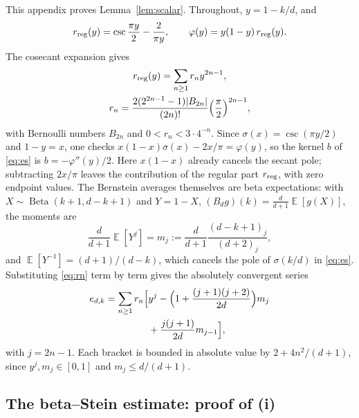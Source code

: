 \documentclass[aps,prl,reprint,superscriptaddress,longbibliography,floatfix,raggedbottom]{revtex4-2}
\newcommand{\abs}[1]{\lvert #1\rvert}
\DeclareMathOperator{\Beta}{Beta}
\DeclareMathOperator{\Ex}{\mathbb E}
\begin{document}
This appendix proves Lemma~\ref{lem:scalar}. Throughout, $y=1-k/d$,
and
\[
r_{\rm reg}(y)=\csc\frac{\pi y}2-\frac2{\pi y},\qquad
\varphi(y)=y(1-y)\,r_{\rm reg}(y).
\]
The cosecant expansion gives
\begin{equation}\label{eq:rn}
\begin{gathered}
r_{\rm reg}(y)=\sum_{n\ge1}r_ny^{2n-1},\\
r_n=\frac{2(2^{2n-1}-1)\abs{B_{2n}}}{(2n)!}
\Bigl(\frac\pi2\Bigr)^{2n-1},
\end{gathered}
\end{equation}
with Bernoulli numbers $B_{2n}$ and $0<r_n<3\cdot4^{-n}$. Since
$\sigma(x)=\csc(\pi y/2)$ and $1-y=x$, one checks
$x(1-x)\sigma(x)-2x/\pi=\varphi(y)$, so the kernel $b$ of
\eqref{eq:es} is
$b=-\varphi''(y)/2$. Here $x(1-x)$ already cancels the secant pole;
subtracting $2x/\pi$ leaves the contribution of the regular part
$r_{\rm reg}$, with zero endpoint values. The
Bernstein averages themselves are beta expectations: with
$X\sim\Beta(k+1,d-k+1)$ and $Y=1-X$,
$(B_dg)(k)=\tfrac d{d+1}\Ex[g(X)]$, the moments are
\[
\frac d{d+1}\Ex[Y^j]=m_j:=\frac d{d+1}
\frac{(d-k+1)_j}{(d+2)_j},
\]
and $\Ex[Y^{-1}]=(d+1)/(d-k)$, which cancels the pole of
$\sigma(k/d)$ in
\eqref{eq:es}. Substituting \eqref{eq:rn} term by term gives the
absolutely convergent series
\begin{equation}\label{eq:finiteeseries}
\begin{split}
e_{d,k}=\sum_{n\ge1}r_n
\Bigl[&y^j-\Bigl(1+\frac{(j+1)(j+2)}{2d}\Bigr)m_j\\
&+\frac{j(j+1)}{2d}m_{j-1}\Bigr],
\end{split}
\end{equation}
with $j=2n-1$. Each bracket is bounded in absolute value by
$2+4n^2/(d+1)$, since $y^j,m_j\in[0,1]$ and $m_j\le d/(d+1)$.

\subsection{The beta--Stein estimate: proof of (i)}
\end{document}
